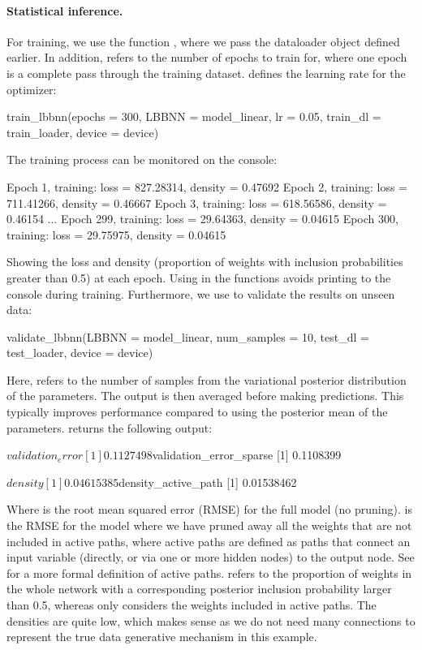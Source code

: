 \paragraph{Statistical inference.} For training, we use the function , where we pass the dataloader object defined earlier. In addition,  refers to the number of epochs to train for, where one epoch is a complete pass through the training dataset.  defines the learning rate for the optimizer:
\begin{example}
train_lbbnn(epochs = 300, LBBNN = model_linear,
            lr = 0.05, train_dl = train_loader, device = device)
\end{example}
The training process can be monitored on the console:
\begin{example}
Epoch 1, training: loss = 827.28314, density = 0.47692 
Epoch 2, training: loss = 711.41266, density = 0.46667 
Epoch 3, training: loss = 618.56586, density = 0.46154 
...
Epoch 299, training: loss = 29.64363, density = 0.04615 
Epoch 300, training: loss = 29.75975, density = 0.04615 
\end{example}
Showing the loss and density (proportion of weights with inclusion probabilities greater than 0.5) at each epoch. Using  in the  functions avoids printing to the console during training. Furthermore, we use  to validate the results on unseen data:
\begin{example}
validate_lbbnn(LBBNN = model_linear, num_samples = 10, test_dl = test_loader,
              device = device)
\end{example}
Here,  refers to the number of samples from the variational posterior distribution of the parameters. The output is then averaged before making predictions. This typically improves performance compared to using the posterior mean of the parameters.  returns the following output:
\begin{example}
$validation_error
[1] 0.1127498

$validation_error_sparse
[1] 0.1108399

$density
[1] 0.04615385

$density_active_path
[1] 0.01538462
\end{example}
Where  is the
root mean squared error (RMSE) for the full model (no pruning).  is the RMSE for the model where we have pruned away all the weights that are not included in active paths, where active paths are defined as paths that connect an input variable (directly, or via one or more hidden nodes) to the output node. See \cite{hoyheim2026explainable} for a more formal definition of active paths.  refers to the proportion of weights in the whole network with a corresponding posterior inclusion probability larger than 0.5, whereas  only considers the weights included in active paths. The densities are quite low, which makes sense as we do not need many connections to represent the true data generative mechanism in this example. 

